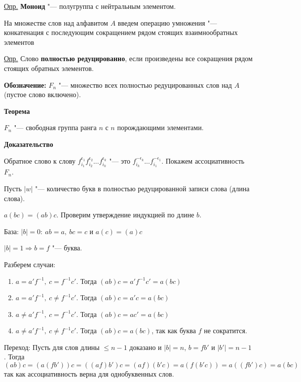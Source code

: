 \documentclass{article}
\begin{document}
\underline{Опр.} \textbf{Моноид} "--- полугруппа с нейтральным элементом.

\vspace{10pt}

На множестве слов над алфавитом $A$ введем операцию умножения "--- конкатенация с последующим сокращением рядом стоящих взаимнообратных элементов

\underline{Опр.} Слово \textbf{полностью редуцированно}, если произведены все сокращения рядом стоящих обратных элементов.

\textbf{Обозначение:} $F_n$ "--- множество всех полностью редуцированных слов над $A$ (пустое слово включено).

\vspace{10pt}

\textbf{Теорема}

$F_n$ "--- свободная группа ранга $n$ с $n$ порождающими элементами.

\textbf{Доказательство}

Обратное слово к слову $f_{i_1}^{\epsilon_1}f_{i_2}^{\epsilon_2}...f_{i_k}^{\epsilon_k}$ "--- это $f_{i_k}^{-\epsilon_k}...f_{i_1}^{-\epsilon_1}$. Покажем ассоциативность $F_n$. 

Пусть $|w|$ "--- количество букв в полностью редуцированной записи слова (длина слова).

$a(bc) = (ab)c$. Проверим утверждение индукцией по длине $b$.

База: $|b| = 0: \  ab = a, \  bc = c$ и $a(c) = (a)c$

$|b| = 1 \Rightarrow b = f$ "--- буква. 

Разберем случаи:
\begin{enumerate}
	\item $a = a'f^{-1}, \  c = f^{-1}c'$. Тогда $(ab)c = a'f^{-1}c' = a(bc)$
	\item $a = a'f^{-1}, \  c \neq f^{-1}c'$. Тогда $(ab)c = a'c = a(bc)$
	\item $a \neq a'f^{-1}, \  c = f^{-1}c'$. Тогда $(ab)c = ac' = a(bc)$
	\item $a \neq a'f^{-1}, \  c \neq f^{-1}c'$. Тогда $(ab)c = a(bc)$, так как буква $f$ не сократится.
\end{enumerate}

Переход: Пусть для слов длины $\leq n - 1$ доказано и $|b| = n$, $b = fb'$ и $|b'| = n - 1$. Тогда $(ab)c = (a(fb'))c = ((af)b')c = (af)(b'c) = a(f(b'c)) = a((fb')c) = a(bc)$ так как ассоциативность верна для однобуквенных слов.

\vspace{10pt}
\end{document}
